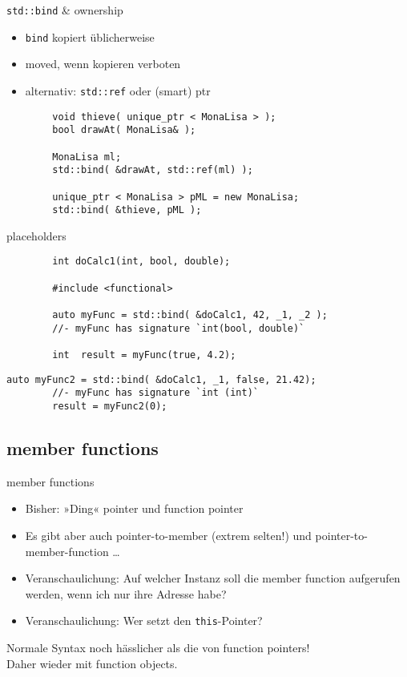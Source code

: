 \begin{frame}[fragile]{ \texttt{std::bind} \& ownership }
	\begin{itemize}
		\item \texttt{bind} kopiert üblicherweise
		\item moved, wenn kopieren verboten
		\item alternativ: \texttt{std::ref} oder (smart) ptr
	\end{itemize}
	
	\pause
	
	\begin{lstlisting}
		void thieve( unique_ptr < MonaLisa > );
		bool drawAt( MonaLisa& );
		
		MonaLisa ml;
		std::bind( &drawAt, std::ref(ml) );
		
		unique_ptr < MonaLisa > pML = new MonaLisa;
		std::bind( &thieve, pML );
	\end{lstlisting}
\end{frame}

\begin{frame}[fragile]{ placeholders }
	\begin{lstlisting}
		int doCalc1(int, bool, double);
		
		#include <functional>
		
		auto myFunc = std::bind( &doCalc1, 42, _1, _2 );
		//- myFunc has signature `int(bool, double)`
		
		int  result = myFunc(true, 4.2);
	\end{lstlisting}
	
	\pause
	
	\begin{lstlisting}[firstnumber=9]
		auto myFunc2 = std::bind( &doCalc1, _1, false, 21.42);
		//- myFunc has signature `int (int)`
		result = myFunc2(0);
	\end{lstlisting}
\end{frame}


\subsection{ member functions }

\begin{frame}[fragile]{ member functions }
	\begin{itemize}
		\item Bisher: »Ding« pointer und function pointer
		\item Es gibt aber auch pointer-to-member (extrem selten!) und pointer-to-member-function \dots
		\item Veranschaulichung: Auf welcher Instanz soll die member function aufgerufen werden, wenn ich nur ihre Adresse habe?
		\item Veranschaulichung: Wer setzt den \texttt{this}-Pointer?
	\end{itemize}
	
	\pause
	
	Normale Syntax noch hässlicher als die von function pointers!	\\
	Daher wieder mit function objects.
\end{frame}

